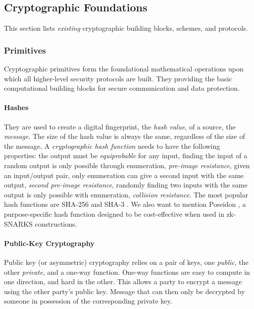 \subsection{Cryptographic Foundations}
\label{subsub:cryptography}

This section lists \emph{existing} cryptographic building blocks, schemes, and protocols.


\subsubsection{Primitives} Cryptographic primitives form the foundational mathematical operations upon which all higher-level security protocols are built.
They providing the basic computational building blocks for secure communication and data protection.

\paragraph{Hashes} They are used to create a digital fingerprint, the \emph{hash value}, of a source, the \emph{message}.
The size of the hash value is always the same, regardless of the size of the message.
A \emph{cryptographic hash function} needs to have the following properties:
the output must be \emph{equiprobable} for any input, finding the input of a random output is only possible through enumeration, \emph{pre-image resistance}, given an input/output pair, only enumeration can give a second input with the same output, \emph{second pre-image resistance}, randomly finding two inputs with the same output is only possible with enumeration, \emph{collision resistance}.
The most popular hash functions are SHA-256 \cite{FIPS180-4} and SHA-3 \cite{FIPS202}.
We also want to mention Poseidon \cite{GKRRS21}, a purpose-specific hash function designed to be cost-effective when used in zk-SNARKS constructions.

\paragraph{Public-Key Cryptography} 
\label{sp:public-key-cryptography}
Public key (or asymmetric) cryptography relies on a pair of keys, one \emph{public}, the other \emph{private}, and a one-way function. 
One-way functions are easy to compute in one direction, and hard in the other. 
This allows a party to encrypt a message using the other party's public key. 
Message that can then only be decrypted by someone in possession of the corresponding private key.

